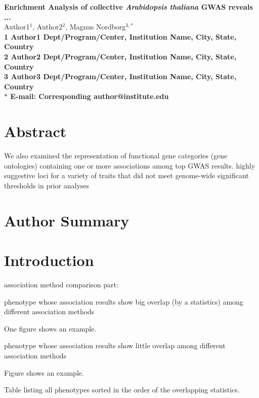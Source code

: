 \documentclass[10pt]{article}
\date{}
\begin{document}
\begin{flushleft}
{\Large
\textbf{Enrichment Analysis of collective \textit{Arabidopsis thaliana} GWAS reveals ...}
}
\\
Author1$^{1}$, 
Author2$^{2}$, 
Magnus Nordborg$^{3,\ast}$
\\
\bf{1} Author1 Dept/Program/Center, Institution Name, City, State, Country
\\
\bf{2} Author2 Dept/Program/Center, Institution Name, City, State, Country
\\
\bf{3} Author3 Dept/Program/Center, Institution Name, City, State, Country
\\
$\ast$ E-mail: Corresponding author@institute.edu
\end{flushleft}

\section*{Abstract}
We also examined the representation of functional gene categories (gene ontologies) containing one or more associations among top GWAS results. highly suggestive loci for a variety of traits that did not meet genome-wide significant thresholds in prior analyses

\section*{Author Summary}

\section*{Introduction}

association method comparison part:

phenotype whose association results show big overlap (by a statistics) among different association methods

	One figure shows an example.

phenotype whose association results show little overlap among different association methods

	Figure shows an example.
	
Table listing all phenotypes sorted in the order of the overlapping statistics.
\end{document}
